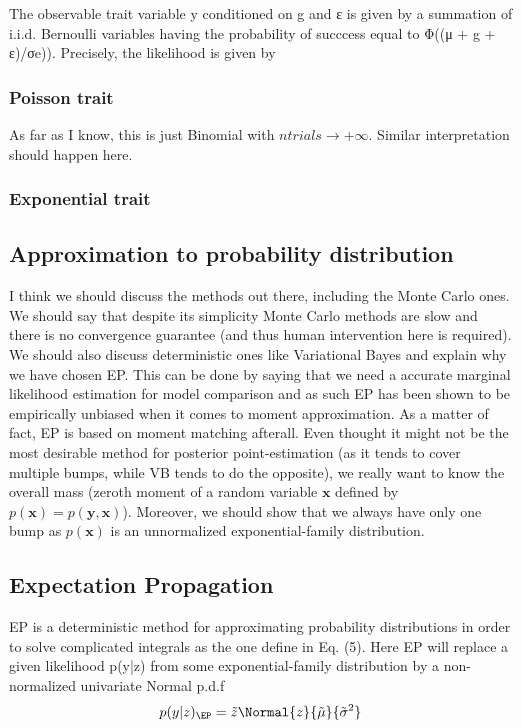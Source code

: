 The observable trait variable y conditioned on g and ε is given by a summation of i.i.d.
Bernoulli variables having the probability of succcess equal to Φ((μ + g + ε)/σe)). Precisely,
the likelihood is given by

\subsubsection{Poisson trait}

As far as I know, this is just Binomial with $ntrials \rightarrow +\infty$. Similar interpretation should happen here.

\subsubsection{Exponential trait}



\subsection{Approximation to probability distribution}

I think we should discuss the methods out there, including the Monte Carlo ones. We should say that despite its simplicity Monte Carlo methods are slow and there is no convergence guarantee (and thus human intervention here is required). We should also discuss deterministic ones like Variational Bayes and explain why we have chosen EP. This can be done by saying that we need a accurate marginal likelihood estimation for model comparison and as such EP has been shown to be empirically unbiased when it comes to moment approximation. As a matter of fact, EP is based on moment matching afterall. Even thought it might not be the most desirable method for posterior point-estimation (as it tends to cover multiple bumps, while VB tends to do the opposite), we really want to know the overall mass (zeroth moment of a random variable $\mathbf x$ defined by $p(\mathbf x) = p(\mathbf y, \mathbf x)$). Moreover, we should show that we always have only one bump as $p(\mathbf x)$ is an unnormalized exponential-family distribution.

\subsection{Expectation Propagation}

EP is a deterministic method for approximating probability distributions in order to solve complicated integrals as the one define in Eq. (5). Here EP will replace a given likelihood p(y|z) from some exponential-family distribution by a non-normalized univariate Normal p.d.f
$$
p(y|z)_{\EP} = \tilde z \Normal{z}{\tilde \mu}{\tilde \sigma^2}
$$

